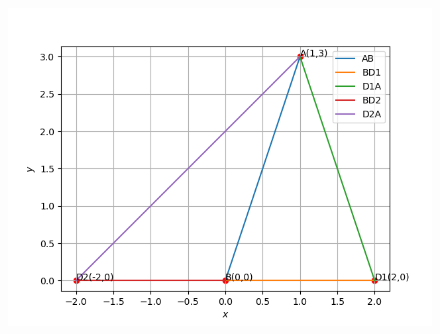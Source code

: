 \documentclass[journal,12pt,onecolumn]{IEEEtran}
\begin{document}
        \begin{figure}[H]
    \centering
    \includegraphics[width = 0.7\columnwidth]{figs2/img.png}
    \caption*{}
    \label{figs}
\end{figure}
\end{document}
